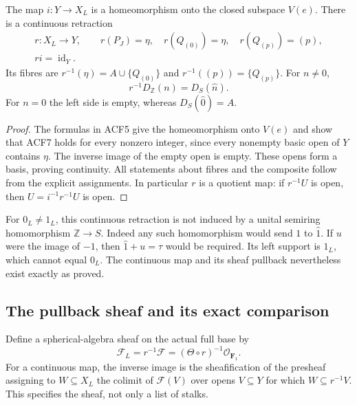 \begin{proposition}
The map $i:Y\to X_L$ is a homeomorphism onto the closed subspace $V(e)$.
There is a continuous retraction
\begin{equation}\tag{ACF6}
 \begin{gathered}
 r:X_L\longrightarrow Y,\qquad
 r(P_J)=\eta,\quad r(Q_{(0)})=\eta,\quad r(Q_{(p)})=(p),\\
 ri=\operatorname{id}_Y.
 \end{gathered}
\end{equation}
Its fibres are $r^{-1}(\eta)=A\cup\{Q_{(0)}\}$ and
$r^{-1}((p))=\{Q_{(p)}\}$. For $n\ne0$,
\begin{equation}\tag{ACF7}
 r^{-1}D_{\mathbb Z}(n)=D_S(\widehat n).
\end{equation}
For $n=0$ the left side is empty, whereas $D_S(\widehat0)=A$.
\end{proposition}
\begin{proof}
The formulas in ACF5 give the homeomorphism onto $V(e)$ and show that
ACF7 holds for every nonzero integer, since every nonempty basic open of
$Y$ contains $\eta$. The inverse image of the empty open is empty.
These opens form a basis, proving continuity. All statements about fibres
and the composite follow from the explicit assignments. In particular
$r$ is a quotient map: if $r^{-1}U$ is open, then
$U=i^{-1}r^{-1}U$ is open.
\end{proof}
For $0_L\ne1_L$, this continuous retraction is not induced by a unital
semiring homomorphism $\mathbb Z\to S$. Indeed any such homomorphism
would send $1$ to $\widehat1$. If $u$ were the image of $-1$, then
$\widehat1+u=\tau$ would be required. Its left support is $1_L$, which
cannot equal $0_L$. The continuous map and its sheaf pullback nevertheless
exist exactly as proved.

\subsection{The pullback sheaf and its exact comparison}
Define a spherical-algebra sheaf on the actual full base by
\begin{equation}\tag{ACF8}
 \mathcal F_L=r^{-1}\mathcal F=(\Theta\circ r)^{-1}
                           \mathcal O_{\mathbf F_1}.
\end{equation}
For a continuous map, the inverse image is the sheafification of the
presheaf assigning to $W\subseteq X_L$ the colimit of $\mathcal F(V)$
over opens $V\subseteq Y$ for which $W\subseteq r^{-1}V$.
This specifies the sheaf, not only a list of stalks.

